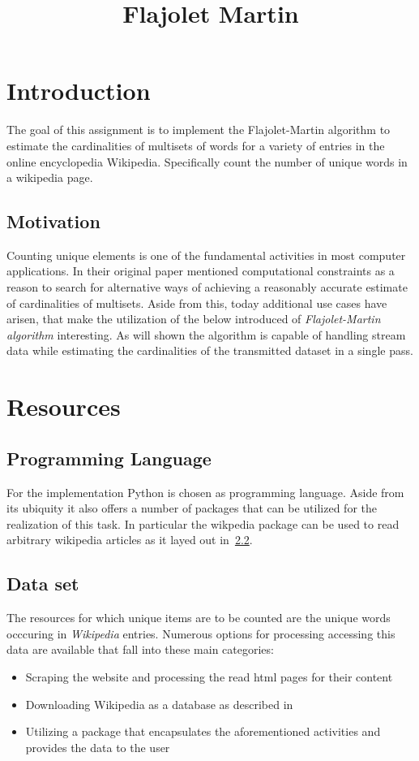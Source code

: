 \documentclass[12pt]{article}
\title{Flajolet Martin}
\begin{document}
\clearpage\null\newpage
\section{Introduction}
The goal of this assignment is to implement the Flajolet-Martin algorithm to estimate the cardinalities of multisets of words for a variety of entries in the online encyclopedia Wikipedia. Specifically count the number of unique words in a wikipedia page.

\subsection{Motivation}
Counting unique elements is one of the fundamental activities in most computer applications. In their original paper \cite{bib:fm85} mentioned computational constraints as a reason to search for alternative ways of achieving a reasonably accurate estimate of cardinalities of multisets. Aside from this, today additional use cases have arisen, that make the utilization of the below introduced of \emph{Flajolet-Martin algorithm} interesting. As will shown the algorithm is capable of handling stream data while estimating the cardinalities of the transmitted dataset in a single pass.


\section{Resources}
\subsection{Programming Language}
For the implementation Python is chosen as programming language. Aside from its ubiquity it also offers a number of packages that can be utilized for the realization of this task. In particular the wikpedia package \cite{bib:goldsmith} can be used to read arbitrary wikipedia articles as it layed out in~\ref{subsec:data}. 

\subsection{Data set}
\label{subsec:data}
The resources for which unique items are to be counted are the unique words occcuring in \emph{Wikipedia} entries. Numerous options for processing accessing this data are available that fall into these main categories:
\begin{itemize}
  \item Scraping the website and processing the read html pages for their content
\item Downloading Wikipedia as a database as described in \cite{bib:wikidl}
  \item Utilizing a package that encapsulates the aforementioned activities and provides the data to the user
\end{itemize}
\end{document}
